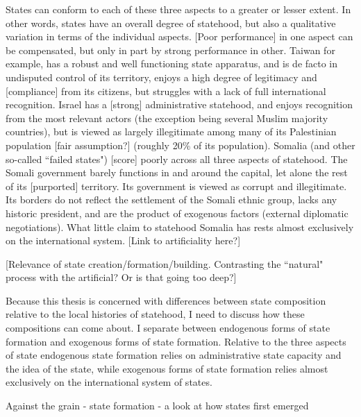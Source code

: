 \documentclass[12pt]{article}
\begin{document}
States can conform to each of these three aspects to a greater or lesser extent.
In other words, states have an overall degree of statehood, but also a
qualitative variation in terms of the individual aspects. [Poor performance] in
one aspect can be compensated, but only in part by strong performance in other.
Taiwan for example, has a robust and well functioning state apparatus, and is de
facto in undisputed control of its territory, enjoys a high degree of legitimacy
and [compliance] from its citizens, but struggles with a lack of full
international recognition. Israel has a [strong] administrative statehood, and
enjoys recognition from the most relevant actors (the exception being several
Muslim majority countries), but is viewed as largely illegitimate among many of
its Palestinian population [fair assumption?] (roughly 20\% of its population).
Somalia (and other so-called ``failed states") [score] poorly across all three
aspects of statehood. The Somali government barely functions in and around the
capital, let alone the rest of its [purported] territory. Its government is
viewed as corrupt and illegitimate. Its borders do not reflect the settlement of
the Somali ethnic group, lacks any historic president, and are the product of
exogenous factors (external diplomatic negotiations). What little claim to
statehood Somalia has rests almost exclusively on the international system.
[Link to artificiality here?]

[Relevance of state creation/formation/building. Contrasting the ``natural"
process with the artificial? Or is that going too deep?] 

Because this thesis is concerned with differences between state composition
relative to the local histories of statehood, I need to discuss how these
compositions can come about. I separate between endogenous forms of state
formation and exogenous forms of state formation. Relative to the three aspects
of state endogenous state formation relies on administrative state capacity and
the idea of the state, while exogenous forms of state formation relies almost
exclusively on the international system of states.

\citet{scott2017against} Against the grain - state formation - a look at how
states first emerged
\end{document}
